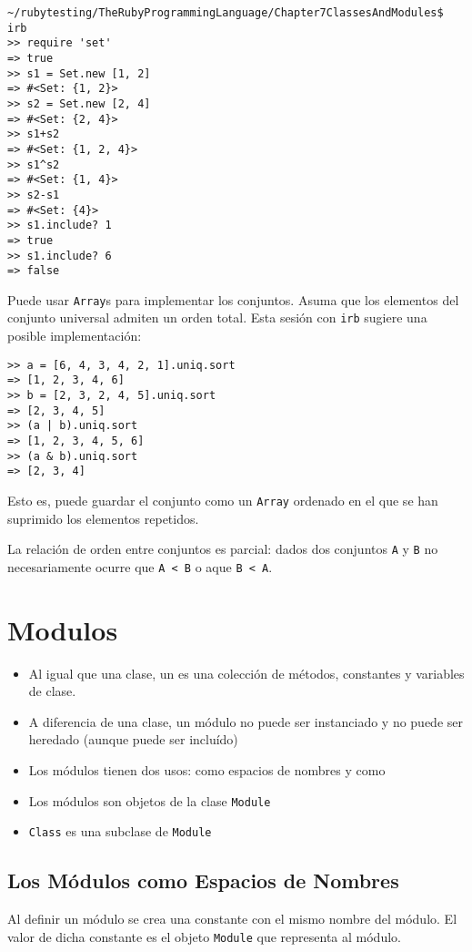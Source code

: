 \begin{verbatim}
~/rubytesting/TheRubyProgrammingLanguage/Chapter7ClassesAndModules$ irb
>> require 'set'
=> true
>> s1 = Set.new [1, 2]
=> #<Set: {1, 2}>
>> s2 = Set.new [2, 4]
=> #<Set: {2, 4}>
>> s1+s2
=> #<Set: {1, 2, 4}>
>> s1^s2
=> #<Set: {1, 4}>
>> s2-s1
=> #<Set: {4}>
>> s1.include? 1
=> true
>> s1.include? 6
=> false
\end{verbatim}
Puede usar \verb|Array|s para implementar los conjuntos.
Asuma que los elementos del conjunto universal admiten un orden total.
Esta sesión con \verb|irb| sugiere una posible implementación:
\begin{verbatim}
>> a = [6, 4, 3, 4, 2, 1].uniq.sort
=> [1, 2, 3, 4, 6]
>> b = [2, 3, 2, 4, 5].uniq.sort
=> [2, 3, 4, 5]
>> (a | b).uniq.sort
=> [1, 2, 3, 4, 5, 6]
>> (a & b).uniq.sort
=> [2, 3, 4]
\end{verbatim}
Esto es, puede guardar el conjunto como un \verb|Array| ordenado
en el que se han suprimido los elementos repetidos.

La relación de orden entre conjuntos es parcial: dados dos conjuntos \verb|A| y \verb|B|
no necesariamente ocurre que \verb|A < B| o aque \verb|B < A|. 


\section{Modulos}

\begin{itemize}
\item
Al igual que una clase, un  es una colección de métodos, constantes y variables de clase.
\item
A diferencia de una clase, un módulo no puede ser instanciado y no puede ser heredado (aunque puede ser incluído)
\item
Los módulos tienen dos usos: como espacios de nombres y como 
\item
Los módulos son objetos de la clase \verb|Module|
\item
\verb|Class| es una subclase de \verb|Module|
\end{itemize}

  \subsection{Los Módulos como Espacios de Nombres}
  Al definir un módulo se crea una constante con el mismo nombre del módulo.
  El valor de dicha constante es el objeto \verb|Module| que representa al módulo.

